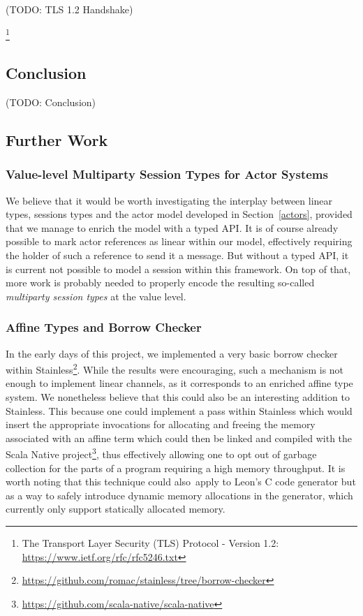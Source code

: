\documentclass[a4paper,twoside]{article}
\newcommand{\TODO}[1]{\textcolor{YellowOrange}{(TODO: #1)}} %
\newcommand{\RefSec}[1]{Section~\ref{#1}}
\begin{document}
\TODO{TLS 1.2 Handshake}

\footnote{The Transport Layer Security (TLS) Protocol - Version 1.2: \url{https://www.ietf.org/rfc/rfc5246.txt}}

\subsection{Conclusion}

\TODO{Conclusion}

\subsection{Further Work}

\subsubsection*{Value-level Multiparty Session Types for Actor Systems}

We believe that it would be worth investigating the interplay between linear types, sessions types and the actor model developed in \RefSec{actors}, provided that we manage to enrich the model with a typed API. It is of course already possible to mark actor references as linear within our model, effectively requiring the holder of such a reference to send it a message. But without a typed API, it is current not possible to model a session within this framework. On top of that, more work is probably needed to properly encode the resulting so-called \textit{multiparty session types}\cite{DBLP:journals/corr/NeykovaY16} at the value level.

\subsubsection*{Affine Types and Borrow Checker}

In the early days of this project, we implemented a very basic borrow checker within Stainless\footnote{\url{https://github.com/romac/stainless/tree/borrow-checker}}. While the results were encouraging, such a mechanism is not enough to implement linear channels, as it corresponds to an enriched affine type system. We nonetheless believe that this could also be an interesting addition to Stainless. This because one could implement a pass within Stainless which would insert the appropriate invocations for allocating and freeing the memory associated with an affine term which could then be linked and compiled with the Scala Native project\footnote{\url{https://github.com/scala-native/scala-native}}, thus effectively allowing one to opt out of garbage collection for the parts of a program requiring a high memory throughput. It is worth noting that this technique could also apply to Leon's C code generator \cite{genc1, genc2} but as a way to safely introduce dynamic memory allocations in the generator, which currently only support statically allocated memory.
\end{document}
